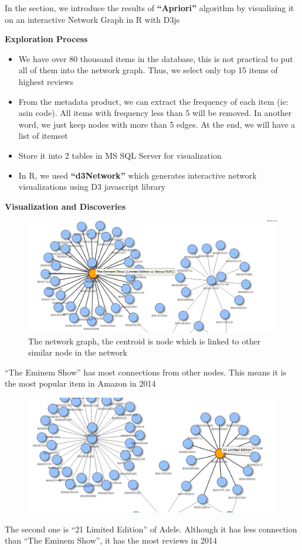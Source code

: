 \documentclass[a4paper,11pt]{article}
\begin{document}
		In the section, we introduce the results of \textbf{“Apriori”} algorithm by visualizing it on an interactive Network Graph in R with D3js

		
		\textbf{Exploration Process}
		\begin{itemize}
			\item We have over 80 thousand items in the database, this is not practical to put all of them into the network graph. Thus, we select only top 15 items of highest reviews
			\item From the metadata product, we can extract the frequency of each item (ie: asin code). All items with frequency less than 5 will be removed. In another word, we just keep nodes with more than 5 edges. At the end, we will have a list of itemset
			\item Store it into 2 tables in MS SQL Server for visualization
			\item In R, we used \textbf{“d3Network”} which generates interactive network visualizations using D3 javascript library
		\end{itemize}
		

		\textbf{Visualization and Discoveries}
		\begin{figure}[H]
				\includegraphics[width=1\textwidth, center]{pic11}
				\caption{The network graph, the centroid is node which is linked to other similar node in the network}
		\end{figure}	
		“The Eminem Show” has most connections from other nodes. This means it is the most popular item in Amazon in 2014
		\begin{figure}[H]
				\includegraphics[width=1\textwidth, center]{pic12}
		\end{figure}	
		The second one is “21 Limited Edition” of Adele. Although it has less connection than “The Eminem Show”, it has the most reviews in 2014
\end{document}
